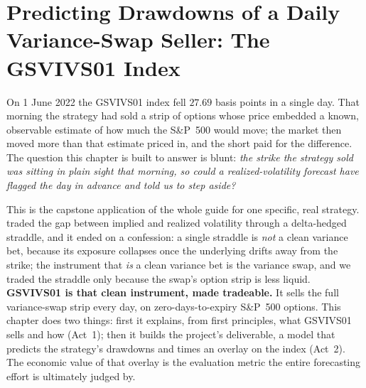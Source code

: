 \chapter{Predicting Drawdowns of a Daily Variance-Swap Seller: The GSVIVS01 Index}
\label{ch:gsvivs}

\begin{application}
On 1 June 2022 the GSVIVS01 index fell $27.69$ basis points in a single day. That morning the strategy had sold a strip of options whose price embedded a known, observable estimate of how much the S\&P~500 would move; the market then moved more than that estimate priced in, and the short paid for the difference. The question this chapter is built to answer is blunt: \emph{the strike the strategy sold was sitting in plain sight that morning, so could a realized-volatility forecast have flagged the day in advance and told us to step aside?}

This is the capstone application of the whole guide for one specific, real strategy.  traded the gap between implied and realized volatility through a delta-hedged straddle, and it ended on a confession: a single straddle is \emph{not} a clean variance bet, because its exposure collapses once the underlying drifts away from the strike; the instrument that \emph{is} a clean variance bet is the variance swap, and we traded the straddle only because the swap's option strip is less liquid. \textbf{GSVIVS01 is that clean instrument, made tradeable.} It sells the full variance-swap strip every day, on zero-days-to-expiry S\&P~500 options. This chapter does two things: first it explains, from first principles, what GSVIVS01 sells and how (Act~1); then it builds the project's deliverable, a model that predicts the strategy's drawdowns and times an overlay on the index (Act~2). The economic value of that overlay is the evaluation metric the entire forecasting effort is ultimately judged by.
\end{application}

